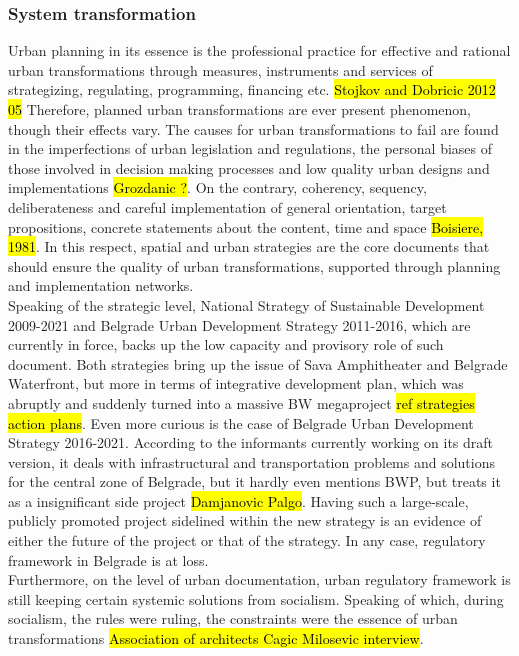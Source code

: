 \documentclass[11pt]{report}
\begin{document}
\subsubsection{System transformation}

Urban planning in its essence is the professional practice for effective and rational urban transformations through measures, instruments and services of strategizing, regulating, programming, financing etc. \hl{Stojkov and Dobricic 2012 05}
Therefore, planned urban transformations are ever present phenomenon, though their effects vary.
The causes for urban transformations to fail are found in the imperfections  of  urban  legislation  and regulations, the personal biases of those involved in decision making processes and low quality urban designs and implementations \hl{Grozdanic ?}.
On the contrary, coherency, sequency,  deliberateness and careful implementation of general orientation, target propositions, concrete statements about the content, time and space \hl{Boisiere, 1981}.
In this respect, spatial and urban strategies are the core documents that should ensure the quality of urban transformations, supported through planning and implementation networks.
\\
Speaking of the strategic level, National Strategy of Sustainable Development 2009-2021 and Belgrade Urban Development Strategy 2011-2016, which are currently in force, backs up the low capacity and provisory role of such document. Both strategies bring up the issue of Sava Amphitheater and Belgrade Waterfront, but more in terms of integrative development plan, which was abruptly and suddenly turned into a massive BW megaproject \hl{ref strategies action plans}.
Even more curious is the case of Belgrade Urban Development Strategy 2016-2021. According to the informants currently working on its draft version, it deals with infrastructural and transportation problems and solutions for the central zone of Belgrade, but it hardly even mentions BWP, but treats it as a insignificant side project \hl{Damjanovic Palgo}. Having such a large-scale, publicly promoted project sidelined within the new strategy is an evidence of either the future of the project or that of the strategy. In any case, regulatory framework in Belgrade is at loss.
\\
Furthermore, on the level of urban documentation, urban regulatory framework is still keeping certain systemic solutions from socialism. Speaking of which, during socialism, the rules were ruling, the constraints were the essence of urban transformations \hl{Association of architects Cagic Milosevic interview}.
\end{document}

